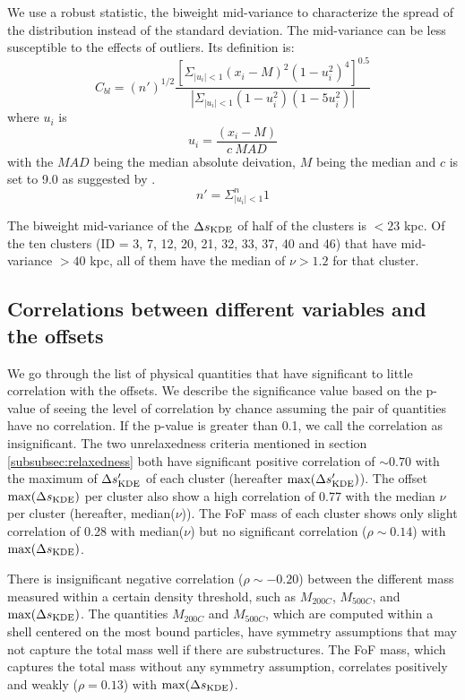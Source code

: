 We use a robust statistic, the biweight mid-variance to characterize the spread
of the distribution instead of the standard deviation. The mid-variance can be
less susceptible to the effects of outliers.
Its definition is:
\begin{equation}
      C_{bl}= (n')^{1/2} \frac{[\Sigma_{|u_i|<1} (x_i-M)^2(1-u_i^2)^4]^{0.5}}
      {|\Sigma_{|u_i|<1} (1-u_i^2)(1-5u_i^2)|}
\end{equation}
where $u_i$ is 
\begin{equation}
		u_{i} = \frac{(x_i-M)}{c~MAD}
\end{equation}
with the $MAD$ being the median absolute deivation, $M$ being the median 
and $c$ is set to 9.0 as suggested by \citep{Beers90}.
\begin{equation}
   n' = \Sigma_{|u_i|<1}^n 1
 \end{equation}

The biweight mid-variance of the $\Delta s_{\rm KDE}$ of half of the clusters
is $< 23$ kpc. Of the ten clusters (ID = 3, 7, 12, 20, 21, 32, 33, 37, 40 and 46) 
that have mid-variance $ > 40$ kpc, all of them have the median of $\nu > 1.2$
for that cluster.
 
\subsection{Correlations between different variables and the offsets}

We go through the list of physical quantities that have significant to little
correlation with the offsets. We describe the significance value based on the
p-value of seeing the level of correlation by chance assuming the pair of 
quantities have no correlation. If the p-value is greater than 0.1, we call the
correlation as insignificant.
The two unrelaxedness criteria mentioned in section \ref{subsubsec:relaxedness}
both have significant positive correlation of $\sim 0.70$
with the maximum of $\Delta s_{\rm KDE}'$ of each cluster
(hereafter $\max(\Delta s_{\rm KDE}')$).
The offset $\max(\Delta s_{\rm KDE})$ per cluster also show a high
correlation of 0.77 with the median $\nu$ per cluster (hereafter,
median($\nu$)). 
The FoF mass of each cluster shows only slight correlation of 0.28 with 
 median($\nu$) but no significant correlation 
($\rho \sim 0.14$) with $\max(\Delta s_{\rm KDE})$. 

There is insignificant negative correlation ($\rho \sim -0.20$) between the different mass 
measured within a certain density threshold, such as $M_{200C}$, $M_{500C}$, 
and $\max(\Delta s_{\rm KDE})$. The quantities $M_{200C}$ and $M_{500C}$, which
are computed within a shell centered on the most bound particles, have
symmetry assumptions that may not capture the total mass well if there are substructures. 
The FoF mass, which
captures the total mass without any symmetry assumption, correlates positively
and weakly 
($\rho = 0.13$) with $\max(\Delta s_{\rm KDE})$.

